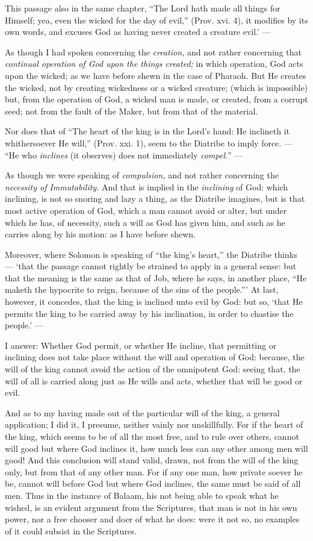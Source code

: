 This passage also in the same chapter, “The Lord hath made all things for Himself; yea, even the wicked for the day of evil,” (Prov. xvi. 4), it modifies by its own words, and excuses God as having never created a creature evil.’ —

As though I had spoken concerning the \emph{creation, }and not rather concerning that \emph{continual operation of God upon the things created; }in which operation, God acts upon the wicked; as we have before shewn in the case of Pharaoh. But He creates the wicked, not by creating wickedness or a wicked creature; (which is impossible) but, from the operation of God, a wicked man is made, or created, from a corrupt seed; not from the fault of the Maker, but from that of the material.

Nor does that of “The heart of the king is in the Lord’s hand: He inclineth it whithersoever He will,” (Prov. xxi. 1), seem to the Diatribe to imply force. — “He who \emph{inclines }(it observes) does not immediately \emph{compel.}” —

As though we were speaking of \emph{compulsion, }and not rather concerning the \emph{necessity of Immutability. }And that is implied in the \emph{inclining }of God: which inclining, is not so snoring and lazy a thing, as the Diatribe imagines, but is that most active operation of God, which a man cannot avoid or alter, but under which he has, of necessity, such a will as God has given him, and such as he carries along by his motion: as I have before shewn.

Moreover, where Solomon is speaking of “the king’s heart,” the Diatribe thinks — ‘that the passage cannot rightly be strained to apply in a general sense: but that the meaning is the same as that of Job, where he says, in another place, “He maketh the hypocrite to reign, because of the sins of the people.”’ At last, however, it concedes, that the king is inclined unto evil by God: but so, ‘that He permits the king to be carried away by his inclination, in order to chastise the people.’ —

I answer: Whether God permit, or whether He incline, that permitting or inclining does not take place without the will and operation of God: because, the will of the king cannot avoid the action of the omnipotent God: seeing that, the will of all is carried along just as He wills and acts, whether that will be good or evil.

And as to my having made out of the particular will of the king, a general application; I did it, I presume, neither vainly nor unskillfully. For if the heart of the king, which seems to be of all the most free, and to rule over others, cannot will good but where God inclines it, how much less can any other among men will good! And this conclusion will stand valid, drawn, not from the will of the king only, but from that of any other man. For if any one man, how private soever he be, cannot will before God but where God inclines, the same must be said of all men. Thus in the instance of Balaam, his not being able to speak what he wished, is an evident argument from the Scriptures, that man is not in his own power, nor a free chooser and doer of what he does: were it not so, no examples of it could subsist in the Scriptures.

